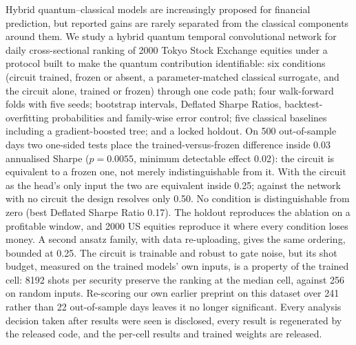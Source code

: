 Hybrid quantum--classical models are increasingly proposed for financial
prediction, but reported gains are rarely separated from the classical
components around them. We study a hybrid quantum temporal convolutional
network for daily cross-sectional ranking of \num{2000} Tokyo Stock Exchange
equities under a protocol built to make the quantum contribution
identifiable: six conditions (circuit trained, frozen or absent, a
parameter-matched classical surrogate, and the circuit alone, trained or
frozen) through one code path; four walk-forward folds with five seeds;
bootstrap intervals, Deflated Sharpe Ratios, backtest-overfitting
probabilities and family-wise error control; five classical baselines
including a gradient-boosted tree; and a locked holdout. On \num{500}
out-of-sample days two one-sided tests place the trained-versus-frozen
difference inside \num{0.03} annualised Sharpe ($p = \num{0.0055}$, minimum
detectable effect \num{0.02}): the circuit is equivalent to a frozen one, not
merely indistinguishable from it. With the circuit as the head's only input
the two are equivalent inside \num{0.25}; against the network with no circuit
the design resolves only \num{0.50}. No condition is distinguishable from zero
(best Deflated Sharpe Ratio \num{0.17}). The holdout reproduces the ablation
on a profitable window, and \num{2000} US equities reproduce it where every
condition loses money. A second ansatz family, with data re-uploading, gives
the same ordering, bounded at \num{0.25}. The circuit is trainable and robust
to gate noise, but its shot budget, measured on the trained models' own
inputs, is a property of the trained cell: \num{8192} shots per security
preserve the ranking at the median cell, against \num{256} on random inputs.
Re-scoring our own earlier preprint on this dataset over \num{241} rather
than \num{22} out-of-sample days leaves it no longer significant. Every
analysis decision taken after results were seen is disclosed, every result is
regenerated by the released code, and the per-cell results and trained
weights are released.
